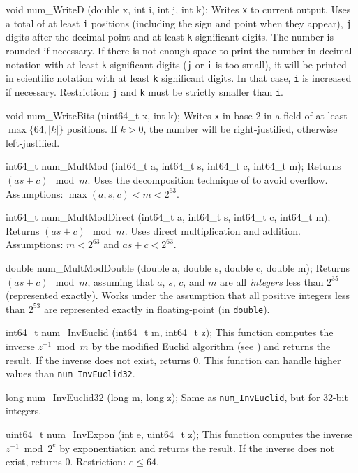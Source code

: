 void num_WriteD (double x, int i, int j, int k);
\endcode
  \tab  Writes {\tt x} to current output.  Uses a total of at least {\tt i}
   positions (including the sign and point when they appear),
   {\tt j} digits after the decimal point and at least {\tt k}
   significant digits.   The number is rounded if necessary.
   If there is not enough space to print the number in decimal notation
   with at least {\tt k} significant digits
   ({\tt j} or {\tt i} is too small), it will be printed in scientific
   notation with at least {\tt k} significant digits.
   In that case, {\tt i} is increased if necessary.
   Restriction: {\tt j} and {\tt k} must be strictly smaller than {\tt i}.
 \endtab
\code

void num_WriteBits (uint64_t x, int k);
\endcode
 \tab Writes {\tt x} in base 2 in a field of at least $\max\{64, |k|\}$ positions.
  If $k>0$, the number will be right-justified, otherwise left-justified.
 \endtab
\code

int64_t num_MultMod (int64_t a, int64_t s, int64_t c, int64_t m);
\endcode
\tab  Returns $(as + c) \mod m$.  Uses the decomposition technique
  of \cite{rLEC91a} to avoid overflow.
	Assumptions: $\max(a,s,c) < m < 2^{63}$.
\endtab
\code

int64_t num_MultModDirect (int64_t a, int64_t s, int64_t c, int64_t m);
\endcode
\tab  Returns $(as + c) \mod m$.  Uses direct multiplication and addition.
  Assumptions: $m < 2^{63}$ and $as+c < 2^{63}$.
\endtab
\code

double num_MultModDouble (double a, double s, double c, double m);
\endcode
 \tab  Returns $(as+c) \mod m$, assuming that
  $a$, $s$, $c$, and $m$ are all {\em integers\/} less than $2^{35}$
  (represented exactly).
  Works under the assumption that all positive integers less than
  $2^{53}$ are represented exactly in floating-point (in {\tt double}).
\endtab
\code

int64_t num_InvEuclid (int64_t m, int64_t z);
\endcode
 \tab  This function computes the inverse $z^{-1}\bmod m$ by the
  modified Euclid algorithm (see \cite[p. 325]{iKNU81a}) and returns
  the result. If the inverse does not exist, returns 0. This function
  can handle higher values than {\tt num\_InvEuclid32}.
\endtab
\code

long num_InvEuclid32 (long m, long z);
\endcode
 \tab  Same as \texttt{num\_InvEuclid}, but for 32-bit integers.
\endtab
\code

uint64_t num_InvExpon (int e, uint64_t z);
\endcode
 \tab
  This function computes the inverse  $z^{-1} \bmod 2^e$
  by exponentiation  and returns the result. If the inverse does not  exist, returns 0.
  Restriction: $e \le 64$.
 \endtab
\code

